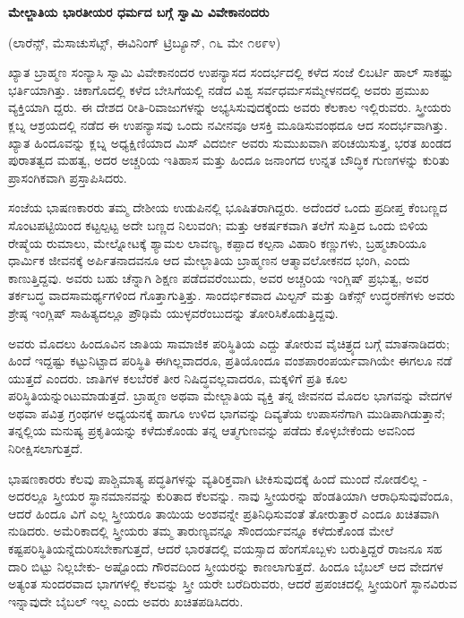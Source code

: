 \begin{center}
\textbf{ಮೇಲ್ಜಾತಿಯ ಭಾರತೀಯರ ಧರ್ಮದ ಬಗ್ಗೆ ಸ್ವಾಮಿ ವಿವೇಕಾನಂದರು}
\end{center}

\begin{center}
(ಲಾರೆನ್ಸ್, ಮೆಸಾಚುಸೆಟ್ಸ್, ಈವಿನಿಂಗ್ ಟ್ರಿಬ್ಯೂನ್, ೧೬ ಮೇ ೧೮೯೪)
\end{center}

ಖ್ಯಾತ ಬ್ರಾಹ್ಮಣ ಸಂನ್ಯಾಸಿ ಸ್ವಾಮಿ ವಿವೇಕಾನಂದರ ಉಪನ್ಯಾಸದ ಸಂದರ್ಭದಲ್ಲಿ ಕಳೆದ ಸಂಜೆ ಲಿಬರ್ಟಿ ಹಾಲ್ ಸಾಕಷ್ಟು ಭರ್ತಿಯಾಗಿತ್ತು. ಚಿಕಾಗೊದಲ್ಲಿ ಕಳೆದ ಬೇಸಿಗೆಯಲ್ಲಿ ನಡೆದ ವಿಶ್ವ ಸರ್ವಧರ್ಮಸಮ್ಮೇಳನದಲ್ಲಿ ಅವರು ಪ್ರಮುಖ ವ್ಯಕ್ತಿಯಾಗಿ ದ್ದರು. ಈ ದೇಶದ ರೀತಿ-ರಿವಾಜುಗಳನ್ನು ಅಭ್ಯಸಿಸುವುದಕ್ಕೆಂದು ಅವರು ಕೆಲಕಾಲ ಇಲ್ಲಿರುವರು. ಸ್ತ್ರೀಯರು ಕ್ಲಬ್ನ ಆಶ್ರಯದಲ್ಲಿ ನಡೆದ ಈ ಉಪನ್ಯಾಸವು ಒಂದು ನವೀನವೂ ಆಸಕ್ತಿ ಮೂಡಿಸುವಂಥದೂ ಆದ ಸಂದರ್ಭವಾಗಿತ್ತು. ಖ್ಯಾತ ಹಿಂದೂವನ್ನು ಕ್ಲಬ್ನ ಅಧ್ಯಕ್ಷಿಣಿಯಾದ ಮಿಸ್ ವಿದರ್ಬೀ ಅವರು ಸುಮುಖವಾಗಿ ಪರಿಚಯಿಸುತ್ತ, ಭರತ ಖಂಡದ ಪುರಾತತ್ವದ ಮಹತ್ವ, ಅದರ ಅಚ್ಚರಿಯ ಇತಿಹಾಸ ಮತ್ತು ಹಿಂದೂ ಜನಾಂಗದ ಉನ್ನತ ಬೌದ್ಧಿಕ ಗುಣಗಳನ್ನು ಕುರಿತು ಪ್ರಾಸಂಗಿಕವಾಗಿ ಪ್ರಸ್ತಾಪಿಸಿದರು.

ಸಂಜೆಯ ಭಾಷಣಕಾರರು ತಮ್ಮ ದೇಶೀಯ ಉಡುಪಿನಲ್ಲಿ ಭೂಷಿತರಾಗಿದ್ದರು. ಅದೆಂದರೆ ಒಂದು ಪ್ರದೀಪ್ತ ಕೆಂಬಣ್ಣದ ಸೊಂಟಪಟ್ಟಿಯಿಂದ ಕಟ್ಟಲ್ಪಟ್ಟ ಅದೇ ಬಣ್ಣದ ನಿಲುವಂಗಿ; ಮತ್ತು ಆಕರ್ಷಕವಾಗಿ ತಲೆಗೆ ಸುತ್ತಿದ ಒಂದು ಬಿಳಿಯ ರೇಷ್ಮೆಯ ರುಮಾಲು, ಮೇಲ್ನೋಟಕ್ಕೆ ಶ್ಯಾಮಲ ಲಾವಣ್ಯ, ಕಪ್ಪಾದ ಕಲ್ಪನಾ ವಿಹಾರಿ ಕಣ್ಣುಗಳು, ಬ್ರಹ್ಮಚಾರಿಯೂ ಧಾರ್ಮಿಕ ಜೀವನಕ್ಕೆ ಅರ್ಪಿತನಾದವನೂ ಆದ ಮೇಲ್ಜಾತಿಯ ಬ್ರಾಹ್ಮಣನ ಆತ್ಮಾವಲೋಕನದ ಭಂಗಿ, ಎಂದು ಕಾಣುತ್ತಿದ್ದವು. ಅವರು ಬಹು ಚೆನ್ನಾಗಿ ಶಿಕ್ಷಣ ಪಡೆದವರೆಂಬುದು, ಅವರ ಅಚ್ಚರಿಯ ಇಂಗ್ಲಿಷ್ ಪ್ರಭುತ್ವ, ಅವರ ತರ್ಕಬದ್ಧ ವಾದಸಾಮರ್ಥ್ಯಗಳಿಂದ ಗೊತ್ತಾಗುತ್ತಿತ್ತು. ಸಾಂದರ್ಭಿಕವಾದ ಮಿಲ್ಟನ್ ಮತ್ತು ಡಿಕೆನ್ಸ್ ಉದ್ಧರಣೆಗಳು ಅವರು ಶ್ರೇಷ್ಠ ಇಂಗ್ಲಿಷ್ ಸಾಹಿತ್ಯದಲ್ಲೂ ಪ್ರೌಢಿಮೆ ಯುಳ್ಳವರೆಂಬುದನ್ನು ತೋರಿಸಿಕೊಡುತ್ತಿದ್ದವು.

ಅವರು ಮೊದಲು ಹಿಂದೂವಿನ ಜಾತಿಯ ಸಾಮಾಜಿಕ ಪರಿಸ್ಥಿತಿಯ ಎದ್ದು ತೋರುವ ವೈಚಿತ್ರ್ಯದ ಬಗ್ಗೆ ಮಾತನಾಡಿದರು; ಹಿಂದೆ ಇದ್ದಷ್ಟು ಕಟ್ಟುನಿಟ್ಟಾದ ಪರಿಸ್ಥಿತಿ ಈಗಿಲ್ಲವಾದರೂ, ಪ್ರತಿಯೊಂದೂ ವಂಶಪಾರಂಪರ್ಯವಾಗಿಯೇ ಈಗಲೂ ನಡೆ ಯುತ್ತದೆ ಎಂದರು. ಜಾತಿಗಳ ಕಲಬೆರಕೆ ತೀರ ನಿಷಿದ್ಧವಲ್ಲವಾದರೂ, ಮಕ್ಕಳಿಗೆ ಪ್ರತಿ ಕೂಲ ಪರಿಸ್ಥಿತಿಯನ್ನುಂಟುಮಾಡುತ್ತದೆ. ಬ್ರಾಹ್ಮಣ ಅಥವಾ ಮೇಲ್ಜಾತಿಯ ವ್ಯಕ್ತಿ ತನ್ನ ಜೀವನದ ಮೊದಲ ಭಾಗವನ್ನು ವೇದಗಳ ಅಥವಾ ಪವಿತ್ರ ಗ್ರಂಥಗಳ ಅಧ್ಯಯನಕ್ಕೆ ಹಾಗೂ ಉಳಿದ ಭಾಗವನ್ನು ದಿವ್ಯತೆಯ ಉಪಾಸನೆಗಾಗಿ ಮುಡಿಪಾಗಿಡುತ್ತಾನೆ; ತನ್ನಲ್ಲಿಯ ಮನುಷ್ಯ ಪ್ರಕೃತಿಯನ್ನು ಕಳೆದುಕೊಂಡು ತನ್ನ ಆತ್ಮಗುಣವನ್ನು ಪಡೆದು ಕೊಳ್ಳಬೇಕೆಂದು ಅವನಿಂದ ನಿರೀಕ್ಷಿಸಲಾಗುತ್ತದೆ.

ಭಾಷಣಕಾರರು ಕೆಲವು ಪಾಶ್ಚಿಮಾತ್ಯ ಪದ್ಧತಿಗಳನ್ನು ವ್ಯತಿರಿಕ್ತವಾಗಿ ಟೀಕಿಸುವುದಕ್ಕೆ ಹಿಂದೆ ಮುಂದೆ ನೋಡಲಿಲ್ಲ - ಅದರಲ್ಲೂ ಸ್ತ್ರೀಯರ ಸ್ಥಾನಮಾನವನ್ನು ಕುರಿತಾದ ಕೆಲವನ್ನು. ನಾವು ಸ್ತ್ರೀಯರನ್ನು ಹೆಂಡತಿಯಾಗಿ ಆರಾಧಿಸುವುವೆಂದೂ, ಆದರೆ ಹಿಂದೂ ವಿಗೆ ಎಲ್ಲ ಸ್ತ್ರೀಯರೂ ತಾಯಿಯ ಅಂಶವನ್ನೇ ಪ್ರತಿನಿಧಿಸುವಂತೆ ತೋರುತ್ತಾರೆ ಎಂದೂ ಖಚಿತವಾಗಿ ನುಡಿದರು. ಅಮೆರಿಕಾದಲ್ಲಿ ಸ್ತ್ರೀಯರು ತಮ್ಮ ತಾರುಣ್ಯವನ್ನೂ ಸೌಂದರ್ಯವನ್ನೂ ಕಳೆದುಕೊಂಡ ಮೇಲೆ ಕಷ್ಟಪರಿಸ್ಥಿತಿಯನ್ನೆದುರಿಸಬೇಕಾಗುತ್ತದೆ, ಆದರೆ ಭಾರತದಲ್ಲಿ ವಯಸ್ಸಾದ ಹೆಂಗಸೊಬ್ಬಳು ಬರುತ್ತಿದ್ದರೆ ರಾಜನೂ ಸಹ ದಾರಿ ಬಿಟ್ಟು ನಿಲ್ಲಬೇಕು- ಅಷ್ಟೊಂದು ಗೌರವದಿಂದ ಸ್ತ್ರೀಯರನ್ನು ಕಾಣಲಾಗುತ್ತದೆ. ಹಿಂದೂ ಬೈಬಲ್ ಆದ ವೇದಗಳ ಅತ್ಯಂತ ಸುಂದರವಾದ ಭಾಗಗಳಲ್ಲಿ ಕೆಲವನ್ನು ಸ್ತ್ರೀ ಯರೇ ಬರೆದಿರುವರು, ಆದರೆ ಪ್ರಪಂಚದಲ್ಲಿ ಸ್ತ್ರೀಯರಿಗೆ ಸ್ಥಾನವಿರುವ ಇನ್ನಾವುದೇ ಬೈಬಲ್ ಇಲ್ಲ ಎಂದು ಅವರು ಖಚಿತಪಡಿಸಿದರು.

